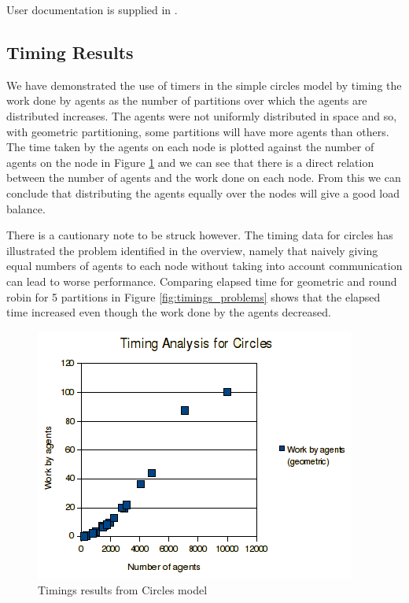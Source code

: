 User documentation is supplied in \cite{TimerAPI}.

\subsection{Timing Results}

We have demonstrated the use of timers in the simple circles model by timing the work done by agents as the number of partitions over which the agents are distributed increases. The agents were not uniformly distributed in space and so, with geometric partitioning, some partitions will have more agents than others. The time taken by the agents on each node is plotted against the number of agents on the node in Figure \ref{fig:circle_timings} and we can see that there is a direct relation between the number of agents and the work done on each node. From this we can conclude that distributing the agents equally over the nodes will give a good load balance.

There is a cautionary note to be struck however. The timing data for circles has illustrated the problem identified in the overview, namely that naively giving equal numbers of agents to each node without taking into account communication can lead to worse performance. Comparing elapsed time for geometric and round robin for 5 partitions in Figure \ref{fig:timings_problems} shows that the elapsed time increased even though the work done by the agents decreased.

\begin{figure}[h]
 \centering
  \includegraphics[scale=0.75]{circles-timings.png}
 \caption{Timings results from Circles model}
 \label{fig:circle_timings}
\end{figure}


